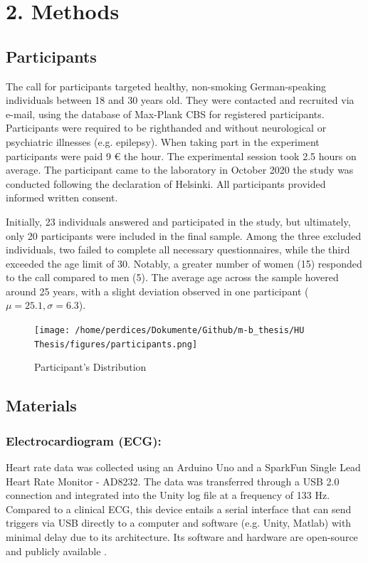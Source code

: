 \documentclass[12pt,oneside,openright]{report}
\begin{document}
\section*{2. Methods}
\subsection*{Participants}
The call for participants targeted healthy, non-smoking German-speaking individuals between 18 and 30 years old. They were contacted and recruited via e-mail, using the database of Max-Plank CBS for registered participants. Participants were required to be righthanded and without neurological or psychiatric illnesses (e.g. epilepsy). When taking part in the experiment participants were paid 9 € the hour. The experimental session took 2.5 hours on average. The participant came to the laboratory in October 2020  the study was conducted following the declaration of Helsinki. All participants provided informed written consent. 

Initially, 23 individuals answered and participated in the study, but ultimately, only 20 participants were included in the final sample. Among the three excluded individuals, two failed to complete all necessary questionnaires, while the third exceeded the age limit of 30. Notably, a greater number of women (15) responded to the call compared to men (5). The average age across the sample hovered around 25 years, with a slight deviation observed in one participant ($\mu=25.1, \sigma=6.3$).

\begin{figure}[h]
    \centering
    \texttt{[image: /home/perdices/Dokumente/Github/m-b\_thesis/HU Thesis/figures/participants.png]}
    \caption{Participant's Distribution}
    \label{fig:mesh1}
\end{figure}

    
\subsection*{Materials}

\subsubsection*{Electrocardiogram (ECG):}
Heart rate data was collected using an Arduino Uno and a SparkFun Single Lead Heart Rate Monitor - AD8232. The data was transferred through a USB 2.0 connection and integrated into the Unity log file at a frequency of 133 Hz. Compared to a clinical ECG, this device entails a serial interface that can send triggers via USB directly to a computer and software (e.g. Unity, Matlab) with minimal delay due to its architecture. Its software and hardware are open-source and publicly available \parencite{TimsECG}.
\end{document}

